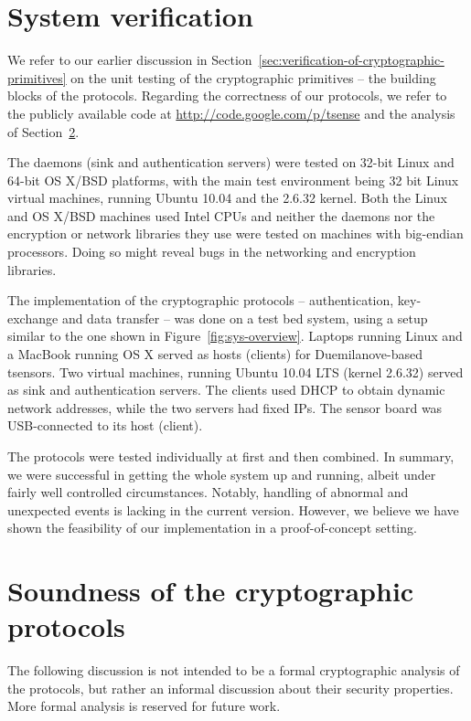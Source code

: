 \section{System verification}

We refer to our earlier discussion in Section~\ref{sec:verification-of-cryptographic-primitives} on the unit testing of the cryptographic primitives -- the building blocks of the protocols. Regarding the correctness of our protocols, we refer to the publicly available code at \url{http://code.google.com/p/tsense} and the analysis of Section~\ref{sec:crypto-protocol-analysis}.

The daemons (sink and authentication servers) were tested on 32-bit Linux and 64-bit OS X/BSD platforms, with the main test environment being 32 bit Linux virtual machines, running Ubuntu 10.04 and the 2.6.32 kernel. Both the Linux and OS X/BSD machines used Intel CPUs and neither the daemons nor the encryption or network libraries they use were tested on machines with big-endian processors. Doing so might reveal bugs in the networking and encryption libraries. 

The implementation of the cryptographic protocols -- authentication, key-exchange and data transfer -- was done on a test bed system, using a setup similar to the one shown in Figure~\ref{fig:sys-overview}. Laptops running Linux and a MacBook running OS X served as hosts (clients) for Duemilanove-based tsensors. Two virtual machines, running Ubuntu 10.04 LTS (kernel 2.6.32) served as sink and authentication servers. The clients used DHCP to obtain dynamic network addresses, while the two servers had fixed IPs. The sensor board was USB-connected to its host (client).

The protocols were tested individually at first and then combined. In summary, we were successful in getting the whole system up and running, albeit under fairly well controlled circumstances. Notably, handling of abnormal and unexpected events is lacking in the current version. However, we believe we have shown the feasibility of our implementation in a proof-of-concept setting.

\section{Soundness of the cryptographic protocols}
\label{sec:crypto-protocol-analysis}

The following discussion is not intended to be a formal cryptographic analysis of the protocols, but rather an informal discussion about their security properties. More formal analysis is reserved for future work.

